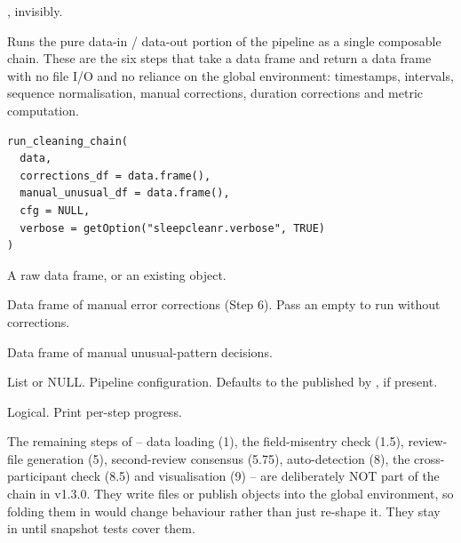 \documentclass[a4paper]{book}
\begin{document}
%
\begin{Value}
, invisibly.
\end{Value}
%
\begin{Description}
Runs the pure data-in / data-out portion of the pipeline as a single
composable chain. These are the six steps that take a data frame and return
a data frame with no file I/O and no reliance on the global environment:
timestamps, intervals, sequence normalisation, manual corrections, duration
corrections and metric computation.
\end{Description}
%
\begin{Usage}
\begin{verbatim}
run_cleaning_chain(
  data,
  corrections_df = data.frame(),
  manual_unusual_df = data.frame(),
  cfg = NULL,
  verbose = getOption("sleepcleanr.verbose", TRUE)
)
\end{verbatim}
\end{Usage}
%
\begin{Arguments}
\begin{ldescription}
\item[\code{data}] A raw data frame, or an existing  object.

\item[\code{corrections\_df}] Data frame of manual error corrections (Step 6).
Pass an empty  to run without corrections.

\item[\code{manual\_unusual\_df}] Data frame of manual unusual-pattern decisions.

\item[\code{cfg}] List or NULL. Pipeline configuration. Defaults to the
 published by , if present.

\item[\code{verbose}] Logical. Print per-step progress.
\end{ldescription}
\end{Arguments}
%
\begin{Details}
The remaining steps of  -- data loading (1), the
field-misentry check (1.5), review-file generation (5), second-review
consensus (5.75), auto-detection (8), the cross-participant check (8.5) and
visualisation (9) -- are deliberately NOT part of the chain in v1.3.0. They
write files or publish objects into the global environment, so folding them
in would change behaviour rather than just re-shape it. They stay in
 until snapshot tests cover them.
\end{Details}
\end{document}
